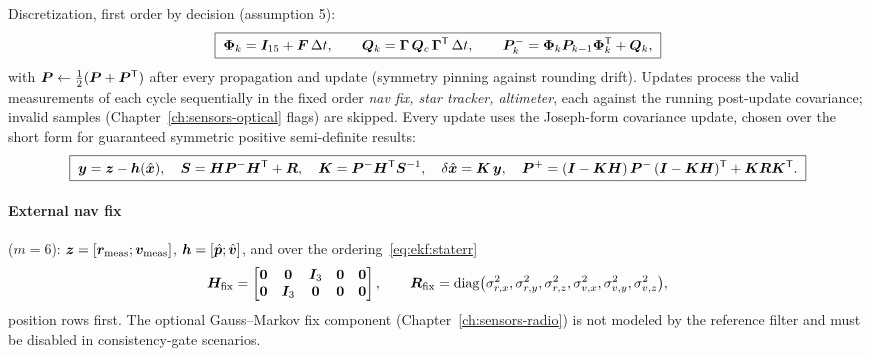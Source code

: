 Discretization, first order by decision (assumption 5):
\begin{equation}
  \boxed{\;
  \bm{\Phi}_k = \bm{I}_{15} + \bm{F}\,\Delta t,
  \qquad
  \bm{Q}_k = \bm{\Gamma}\,\bm{Q}_c\,\bm{\Gamma}^{\mathsf T}\,
    \Delta t,
  \qquad
  \bm{P}_k^{-} = \bm{\Phi}_k \bm{P}_{k-1} \bm{\Phi}_k^{\mathsf T}
    + \bm{Q}_k,
  \;}
  \label{eq:ekf:disc}
\end{equation}
with $\bm{P} \leftarrow \tfrac12(\bm{P} + \bm{P}^{\mathsf T})$
after every propagation and update (symmetry pinning against rounding
drift). Updates process the valid measurements of each cycle
sequentially in the fixed order \emph{nav fix, star tracker,
altimeter}, each against the running post-update covariance; invalid
samples (Chapter~\ref{ch:sensors-optical} flags) are skipped. Every
update uses the Joseph-form covariance update, chosen over the short
form for guaranteed symmetric positive semi-definite results:
\begin{equation}
  \boxed{\;
  \bm{y} = \bm{z} - \bm{h}(\hat{\bm{x}}),
  \quad
  \bm{S} = \bm{H}\bm{P}^{-}\bm{H}^{\mathsf T} + \bm{R},
  \quad
  \bm{K} = \bm{P}^{-}\bm{H}^{\mathsf T}\bm{S}^{-1},
  \quad
  \delta\hat{\bm{x}} = \bm{K}\,\bm{y},
  \quad
  \bm{P}^{+} = (\bm{I} - \bm{K}\bm{H})\,\bm{P}^{-}\,
    (\bm{I} - \bm{K}\bm{H})^{\mathsf T}
    + \bm{K}\bm{R}\bm{K}^{\mathsf T}.
  \;}
  \label{eq:ekf:joseph}
\end{equation}

\paragraph{External nav fix} ($m = 6$): $\bm{z} =
[\bm{r}_{\mathrm{meas}}; \bm{v}_{\mathrm{meas}}]$, $\bm{h} =
[\hat{\bm{p}}; \hat{\bm{v}}]$, and over the
ordering~\eqref{eq:ekf:staterr}
\begin{equation}
  \bm{H}_{\mathrm{fix}} =
  \begin{bmatrix}
    \bm{0} & \bm{0} & \bm{I}_3 & \bm{0} & \bm{0} \\
    \bm{0} & \bm{I}_3 & \bm{0} & \bm{0} & \bm{0}
  \end{bmatrix},
  \qquad
  \bm{R}_{\mathrm{fix}} = \mathrm{diag}\bigl(\sigma_{r,x}^2,
    \sigma_{r,y}^2, \sigma_{r,z}^2,
    \sigma_{v,x}^2, \sigma_{v,y}^2, \sigma_{v,z}^2\bigr),
  \label{eq:ekf:navfixH}
\end{equation}
position rows first. The optional Gauss--Markov fix component
(Chapter~\ref{ch:sensors-radio}) is not modeled by the reference filter
and must be disabled in consistency-gate scenarios.

